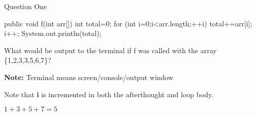 \begin{topic}{Question One}

\begin{java}
public void f(int arr[]) {
    int total=0;
    for (int i=0;i<arr.length;++i) {
        total+=arr[i];
        i++;
    }
    System.out.println(total);
}
\end{java}
What would be output to the terminal if f was called with the array \{1,2,3,3,5,6,7\}?

\begin{subtopic}{2}
\textbf{Note:} Terminal means screen/console/output window
\end{subtopic}

\begin{subtopic}{3}
Note that \textbf{i} is incremented in both the afterthought and loop body.

$1 + 3 + 5 + 7 = 5$
\end{subtopic}

\end{topic}

